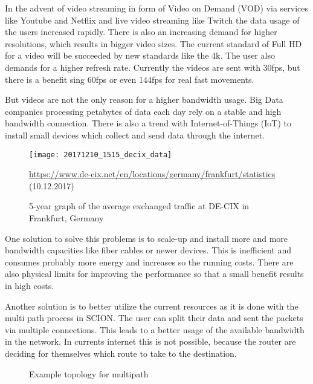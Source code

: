 \documentclass[thesis.tex]{subfiles}
\begin{document}
In the advent of video streaming in form of Video on Demand (VOD) via services like Youtube and Netflix and live video streaming like Twitch the data usage of the users increased rapidly. There is also an increasing demand for higher resolutions, which results in bigger video sizes. The current standard of Full HD for a video will be succeeded by new standards like the 4k. The user also demands for a higher refresh rate. Currently the videos are sent with 30fps, but there is a benefit sing 60fps or even 144fps for real fast movements.

But videos are not the only reason for a higher bandwidth usage. Big Data companies processing petabytes of data each day rely on a stable and high bandwidth connection. There is also a trend with Internet-of-Things (IoT) to install small devices which collect and send data through the internet.

\begin{figure}
    \centering
    \texttt{[image: 20171210\_1515\_decix\_data]}
    \caption*{\tiny{ \url{https://www.de-cix.net/en/locations/germany/frankfurt/statistics} (10.12.2017)}}
    \caption{5-year graph of the average exchanged traffic at DE-CIX in Frankfurt, Germany}
    \label{fig:intro:decixData}
\end{figure}

One solution to solve this problems is to scale-up and install more and more bandwidth capacities like fiber cables or newer devices. This is inefficient and consumes probably more energy and increases so the running costs. There are also physical limits for improving the performance so that a small benefit results in high costs.

Another solution is to better utilize the current resources as it is done with the multi path process in SCION. The user can split their data and sent the packets via multiple connections. This leads to a better usage of the available bandwidth in the network. In currents internet this is not possible, because the router are deciding for themselves which route to take to the destination. 

\begin{figure}[h]
    \centering
    \caption{Example topology for multipath}
    \label{fig:intro:exampleMultipath}
\end{figure}
\end{document}
